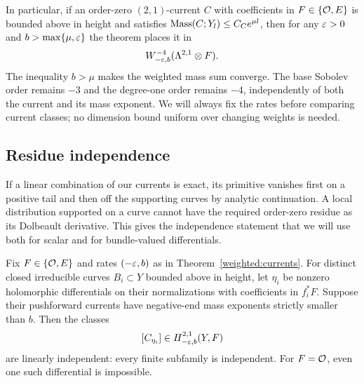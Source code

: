 In particular, if an order-zero $(2,1)$-current $C$ with coefficients
in $F\in\{\mathcal O,E\}$ is bounded above in height and satisfies
$\operatorname{Mass}(C;Y_l)\le C_Ce^{\mu l}$, then for any $\varepsilon>0$ and
$b>\max\{\mu,\varepsilon\}$ the theorem places it in
\[
 W^{-4}_{-\varepsilon,b}(\Lambda^{2,1}\otimes F).
\]
The inequality $b>\mu$ makes the weighted mass sum converge. The base
Sobolev order remains $-3$ and the degree-one order remains $-4$,
independently of both the current and its mass exponent. We will always
fix the rates before comparing current classes; no dimension bound
uniform over changing weights is needed.

\subsection{Residue independence}

If a linear combination of our currents is exact, its primitive
vanishes first on a positive tail and then off the supporting curves
by analytic continuation. A local distribution supported on a curve
cannot have the required order-zero residue as its Dolbeault
derivative. This gives the independence statement that we will use
both for scalar and for bundle-valued differentials.

\begin{proposition}\label{curve:residue}
Fix $F\in\{\mathcal O,E\}$ and rates $(-\varepsilon,b)$ as in
Theorem~\ref{weighted:currents}.  For distinct closed irreducible curves
$B_i\subset Y$ bounded above in height, let $\eta_i$ be nonzero
holomorphic differentials on their normalizations with coefficients
in $f_i^*F$.  Suppose their pushforward currents have negative-end mass
exponents strictly smaller than $b$.  Then the classes
\[
 [C_{\eta_i}]\in H^{2,1}_{-\varepsilon,b}(Y,F)
\]
are linearly independent: every finite subfamily is independent.
For $F=\mathcal O$, even one such differential is impossible.
\end{proposition}

